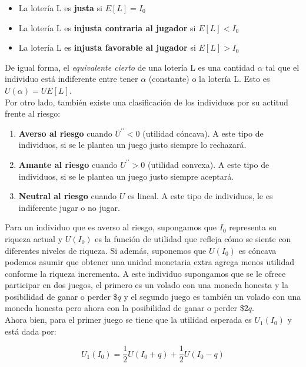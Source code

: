 \begin{itemize}
    \item La lotería L es \textbf{justa} si $E[L] = I_0$
    \item La lotería L es \textbf{injusta contraria al jugador} si $E[L] < I_0$
    \item La lotería L es \textbf{injusta favorable al jugador} si  $E[L] > I_0$
\end{itemize}

De igual forma, el \textit{equivalente cierto} de una lotería L es una cantidad $\alpha$ tal que el individuo está indiferente entre tener $\alpha$ (constante) o la lotería L. Esto es $U(\alpha) = UE[L]$. \\

Por otro lado, también existe una clasificación de los individuos por su actitud frente al riesgo: 

\begin{enumerate}
    \item \textbf{Averso al riesgo} cuando $U^{\prime \prime} < 0$ (utilidad cóncava). A este tipo de individuos, si se le plantea un juego justo siempre lo rechazará.
    \item \textbf{Amante al riesgo} cuando $U^{\prime \prime} > 0$ (utilidad convexa). A este tipo de individuos, si se le plantea un juego justo siempre aceptará.
    \item \textbf{Neutral al riesgo} cuando $U$ es lineal. A este tipo de individuos, le es indiferente jugar o no jugar.
\end{enumerate}

Para un individuo que es averso al riesgo, supongamos que $I_0$ representa su riqueza actual y $U(I_0)$ es la función de utilidad que refleja cómo se siente con diferentes niveles de riqueza. Si además, suponemos que $U(I_0)$ es cóncava podemos asumir que obtener una unidad monetaria extra agrega menos utilidad conforme la riqueza incrementa. A este individuo supongamos que se le ofrece participar en dos juegos, el primero es un volado con una moneda honesta y la posibilidad de ganar o perder \$$q$ y el segundo juego es también un volado con una moneda honesta pero ahora con la posibilidad de ganar o perder \$$2q$. \\

Ahora bien, para el primer juego se tiene que la utilidad esperada es $U_{1}(I_0)$ y está dada por: 

$$
U_{1}(I_0) = \frac{1}{2}U(I_0 + q) + \frac{1}{2}U(I_0 - q)
$$


